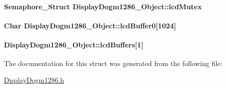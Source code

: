 \paragraph[{lcd\+Mutex}]{\setlength{\rightskip}{0pt plus 5cm}Semaphore\+\_\+\+Struct Display\+Dogm1286\+\_\+\+Object\+::lcd\+Mutex}\label{struct_display_dogm1286___object_a97892f1e0397712d22aad35bccf7924c}
\paragraph[{lcd\+Buffer0}]{\setlength{\rightskip}{0pt plus 5cm}Char Display\+Dogm1286\+\_\+\+Object\+::lcd\+Buffer0\mbox{[}1024\mbox{]}}\label{struct_display_dogm1286___object_adf18a6154d387bb4970c07dcaa0236ee}
\paragraph[{lcd\+Buffers}]{ Display\+Dogm1286\+\_\+\+Object\+::lcd\+Buffers\mbox{[}1\mbox{]}}\label{struct_display_dogm1286___object_a965896b532f1b40620ad632b5f509e24}


The documentation for this struct was generated from the following file\+:\begin{DoxyCompactItemize}
\item 
\hyperlink{_display_dogm1286_8h}{Display\+Dogm1286.\+h}\end{DoxyCompactItemize}
